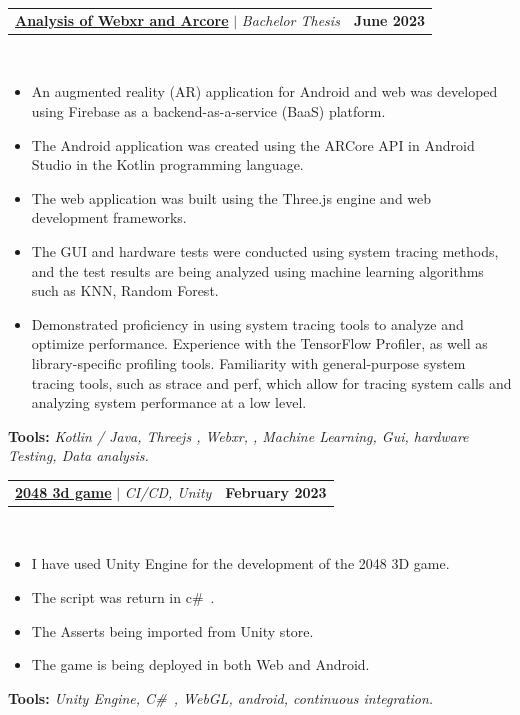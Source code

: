 \documentclass[letterpaper,11pt]{article}
\makeatletter
\newcommand{\resumeItem}[1]{
  \item\small{
    {#1 \vspace{-2pt}}
  }
}
\newcommand{\resumeProjectHeading}[2]{
    \item
    \begin{tabular*}{1.001\textwidth}{l@{\extracolsep{\fill}}r}
      \small#1 & \textbf{\small #2}\\
    \end{tabular*}\vspace{-7pt}
}
\newcommand{\resumeItemListStart}{\begin{itemize}}
\newcommand{\resumeItemListEnd}{\end{itemize}\vspace{-5pt}}
\makeatother
\begin{document}
 \resumeProjectHeading
          {\textbf{\href{https://www.yakkshit.com/#project-1}{Analysis of Webxr and Arcore}} $|$ \emph{Bachelor Thesis \faGithub}}{June 2023}\\
          \vspace{9pt}
          \vspace{-8pt}
          \resumeItemListStart
            \resumeItem{An augmented reality (AR) application for Android and web was developed using Firebase as a backend-as-a-service (BaaS) platform.}
            \resumeItem{The Android application was created using the ARCore API in Android Studio in the Kotlin programming language.}
            \resumeItem{The web application was built using the Three.js engine and web development frameworks.}
            \resumeItem{The GUI and hardware tests were conducted using system tracing methods, and the test results are being analyzed using machine learning algorithms such as KNN, Random Forest.}
            \resumeItem{Demonstrated proficiency in using system tracing tools to analyze and optimize performance. Experience with the TensorFlow Profiler, as well as library-specific profiling tools. Familiarity with general-purpose system tracing tools, such as strace and perf, which allow for tracing system calls and analyzing system performance at a low level.}
          \resumeItemListEnd 
          \textbf{Tools:}\emph{
                                Kotlin / Java, Threejs , Webxr, , Machine Learning, Gui, hardware Testing, Data analysis.}


                

 \resumeProjectHeading
          {\textbf{\href{https://github.com/yakkshit/2048-3d-master.git}{2048 3d game}} $|$ \emph{CI/CD, Unity \faGithub}}{February 2023}\\
          \vspace{9pt}
          \vspace{-8pt}
          \resumeItemListStart
            \resumeItem{I have used Unity Engine for the development of the 2048 3D game.}
            \resumeItem{The script was return in c\#\ .}
            \resumeItem{The Asserts being imported from Unity store.}
            \resumeItem{The game is being deployed in both Web and Android.}
          \resumeItemListEnd 
          \textbf{Tools:}\emph{
                                Unity Engine, C\#\ , WebGL, android, continuous integration.}
         
\end{document}
